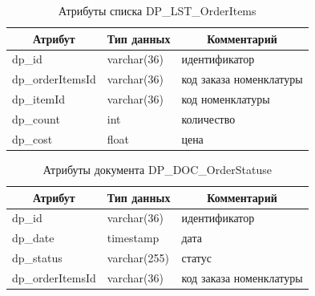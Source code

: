 \begin{table}[p]
    \centering\small

    \caption{Атрибуты списка DP\_LST\_OrderItems}
    \label{tab:DP_LST_OrderItems}

    \begin{tabular}{|p{5cm}|p{2.5cm}|p{9cm}|}
        \hline
        \multicolumn{1}{|c|}{Атрибут}
        & \multicolumn{1}{c|}{Тип данных}
        & \multicolumn{1}{c|}{Комментарий}
        \\ \hline

        dp\_id & varchar(36) & идентификатор \\ \hline
        dp\_orderItemsId & varchar(36) & код заказа номенклатуры \\ \hline
        dp\_itemId & varchar(36) & код номенклатуры \\ \hline
        dp\_count & int & количество \\ \hline
        dp\_cost & float & цена \\ \hline
    \end{tabular}
\end{table}

\begin{table}[p]
    \centering\small

    \caption{Атрибуты документа DP\_DOC\_OrderStatuse}
    \label{tab:DP_DOC_OrderStatuses}

    \begin{tabular}{|p{5cm}|p{2.5cm}|p{9cm}|}
        \hline
        \multicolumn{1}{|c|}{Атрибут}
        & \multicolumn{1}{c|}{Тип данных}
        & \multicolumn{1}{c|}{Комментарий}
        \\ \hline

        dp\_id & varchar(36) & идентификатор \\ \hline
        dp\_date & timestamp & дата \\ \hline
        dp\_status & varchar(255) & статус \\ \hline
        dp\_orderItemsId & varchar(36) & код заказа номенклатуры \\ \hline
    \end{tabular}
\end{table}

